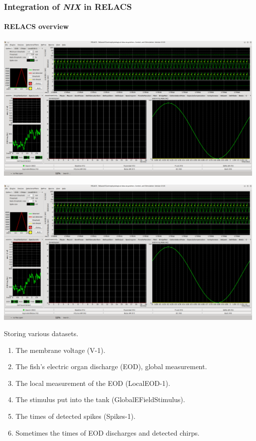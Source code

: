\documentclass[pdftex, xcolor=table]{beamer}
\newcommand{\nix}{\textit{NIX}}
\begin{document}
\begin{frame}
  \frametitle{Integration of \nix{} in RELACS}
  \framesubtitle{RELACS overview}
   {
  \begin{center}
    \includegraphics[width=\columnwidth]{images/relacs_ephys}
  \end{center}
  } {
    \begin{center}
      \includegraphics[width=0.45\columnwidth]{images/relacs_ephys}
    \end{center}
    Storing various datasets.
    \begin{enumerate}
    \item The membrane voltage (V-1).
    \item The fish's electric organ discharge (EOD), global measurement.
    \item The local measurement of the EOD (LocalEOD-1).
    \item The stimulus put into the tank (GlobalEFieldStimulus).
    \item The times of detected spikes (Spikes-1).
    \item Sometimes the times of EOD discharges and detected chirps.
    \end{enumerate}
  }
\end{frame}
\end{document}
